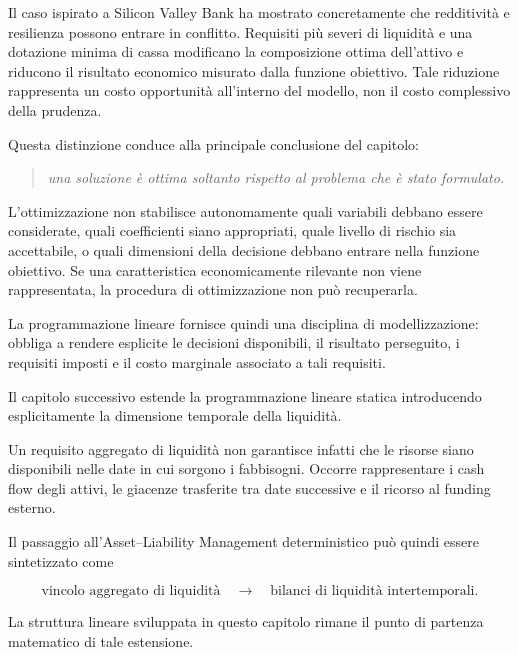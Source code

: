 Il caso ispirato a Silicon Valley Bank ha mostrato concretamente che
redditivit\`a e resilienza possono entrare in conflitto. Requisiti pi\`u
severi di liquidit\`a e una dotazione minima di cassa modificano la
composizione ottima dell'attivo e riducono il risultato economico misurato
dalla funzione obiettivo. Tale riduzione rappresenta un costo opportunit\`a
all'interno del modello, non il costo complessivo della prudenza.

Questa distinzione conduce alla principale conclusione del capitolo:

\begin{quote}
\emph{una soluzione \`e ottima soltanto rispetto al problema che \`e stato
formulato.}
\end{quote}

L'ottimizzazione non stabilisce autonomamente quali variabili debbano essere
considerate, quali coefficienti siano appropriati, quale livello di rischio
sia accettabile, o quali dimensioni della decisione debbano entrare nella
funzione obiettivo. Se una caratteristica economicamente rilevante non viene
rappresentata, la procedura di ottimizzazione non pu\`o recuperarla.

La programmazione lineare fornisce quindi una disciplina di modellizzazione:
obbliga a rendere esplicite le decisioni disponibili, il risultato perseguito,
i requisiti imposti e il costo marginale associato a tali requisiti.





Il capitolo successivo estende la programmazione lineare
statica introducendo esplicitamente la dimensione temporale
della liquidit\`{a}.

Un requisito aggregato di liquidit\`{a} non garantisce infatti
che le risorse siano disponibili nelle date in cui sorgono
i fabbisogni. Occorre rappresentare i cash flow degli attivi,
le giacenze trasferite tra date successive e il ricorso
al funding esterno.

Il passaggio all'Asset--Liability Management deterministico
pu\`{o} quindi essere sintetizzato come

\[
\boxed{
\text{vincolo aggregato di liquidit\`{a}}
\quad\longrightarrow\quad
\text{bilanci di liquidit\`{a} intertemporali}.
}
\]

La struttura lineare sviluppata in questo capitolo
rimane il punto di partenza matematico di tale estensione.

